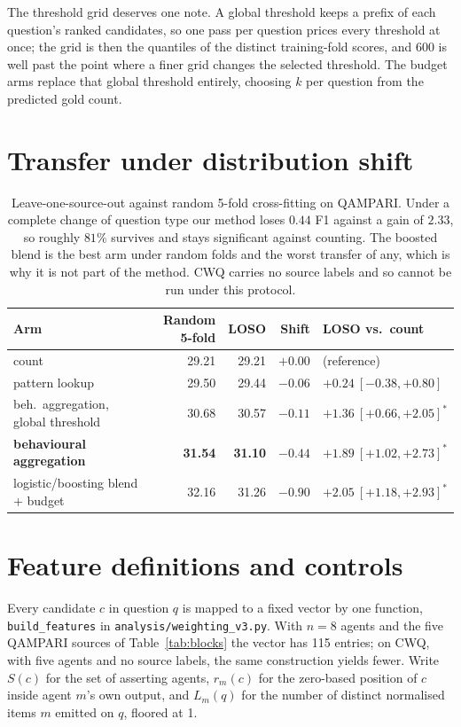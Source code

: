\documentclass[11pt]{article}
\begin{document}
The threshold grid deserves one note. A global threshold keeps a prefix of each question's ranked candidates, so one pass per question prices every threshold at once; the grid is then the quantiles of the distinct training-fold scores, and 600 is well past the point where a finer grid changes the selected threshold. The budget arms replace that global threshold entirely, choosing $k$ per question from the predicted gold count.

\section{Transfer under distribution shift}
\label{app:proc}

\begin{table}[t]
  \caption{Leave-one-source-out against random 5-fold cross-fitting on QAMPARI. Under a complete change of question type our method loses $0.44$ F1 against a gain of $2.33$, so roughly $81\%$ survives and stays significant against counting. The boosted blend is the best arm under random folds and the worst transfer of any, which is why it is not part of the method. CWQ carries no source labels and so cannot be run under this protocol.}
  \label{tab:loso}
  \centering
  \begin{tabular}{lrrrl}
    \toprule
    Arm & Random 5-fold & LOSO & Shift & LOSO vs.\ count \\
    \midrule
    count                        & 29.21 & 29.21 & $+0.00$ & (reference) \\
    pattern lookup               & 29.50 & 29.44 & $-0.06$ & $+0.24\ [-0.38,+0.80]$ \\
    beh.\ aggregation, global threshold & 30.68 & 30.57 & $-0.11$ & $+1.36\ [+0.66,+2.05]^*$ \\
    \textbf{behavioural aggregation} & \textbf{31.54} & \textbf{31.10} & $\mathbf{-0.44}$ & $\mathbf{+1.89\ [+1.02,+2.73]^*}$ \\
    logistic/boosting blend + budget & 32.16 & 31.26 & $-0.90$ & $+2.05\ [+1.18,+2.93]^*$ \\
    \bottomrule
  \end{tabular}
\end{table}

\section{Feature definitions and controls}
\label{app:features}

Every candidate $c$ in question $q$ is mapped to a fixed vector by one function, \texttt{build\_features} in \texttt{analysis/weighting\_v3.py}. With $n=8$ agents and the five QAMPARI sources of Table~\ref{tab:blocks} the vector has 115 entries; on CWQ, with five agents and no source labels, the same construction yields fewer. Write $S(c)$ for the set of asserting agents, $r_m(c)$ for the zero-based position of $c$ inside agent $m$'s own output, and $L_m(q)$ for the number of distinct normalised items $m$ emitted on $q$, floored at 1.
\end{document}
